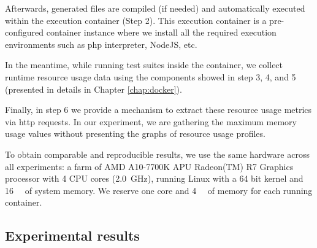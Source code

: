 Afterwards, generated files are compiled (if needed) and automatically executed within the execution container (Step 2). This execution container is a pre-configured container instance where we install all the required execution environments such as php interpreter, NodeJS, etc. 

In the meantime, while running test suites inside the container, we collect runtime resource usage data using the components showed in step 3, 4, and 5 (presented in details in Chapter \ref{chap:docker}).

Finally, in step 6 we provide a mechanism to extract these resource usage metrics via http requests. In our experiment, we are gathering the maximum memory usage values without presenting the graphs of resource usage profiles.

To obtain comparable and reproducible results, we use the same hardware across all experiments: a farm of AMD A10-7700K APU Radeon(TM) R7 Graphics processor with 4 CPU cores (\SI{2.0}{\GHz}), running Linux with a 64 bit kernel and \SI{16}{\giga\byte} of system memory. We reserve one core and \SI{4}{\giga\byte} of memory for each running container. 

\subsection{Experimental results}
